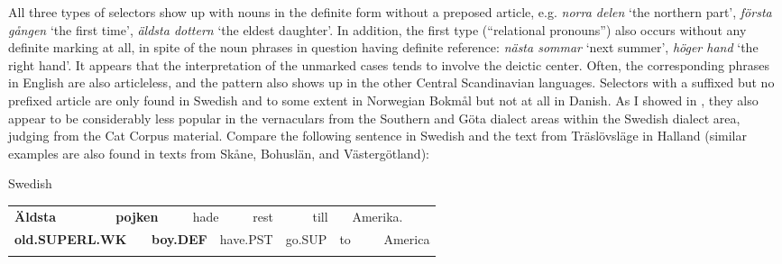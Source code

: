 \begin{styleBodytextC}
All three types of selectors show up with nouns in the definite form without a preposed article, e.g. \textit{norra delen} ‘the northern part’, \textit{första gången} ‘the first time’, \textit{äldsta dottern} ‘the eldest daughter’. In addition, the first type (“relational pronouns”) also occurs without any definite marking at all, in spite of the noun phrases in question having definite reference: \textit{nästa sommar} ‘next summer’, \textit{höger hand} ‘the right hand’. It appears that the interpretation of the unmarked cases tends to involve the deictic center. Often, the corresponding phrases in English are also articleless, and the pattern also shows up in the other Central Scandinavian languages. Selectors with a suffixed but no prefixed article are only found in Swedish and to some extent in Norwegian Bokmål but not at all in Danish. As I showed in \citet{Dahl2003}, they also appear to be considerably less popular in the vernaculars from the Southern and Göta dialect areas within the Swedish dialect area, judging from the Cat Corpus material. Compare the following sentence in Swedish and the text from Träslövsläge in Halland (similar examples are also found in texts from Skåne, Bohuslän, and Västergötland):

\end{styleBodytextC}


\begin{listWWNumileveli}
\item 

\end{listWWNumileveli}

\begin{listWWNumlxiileveli}
\item 

\begin{styleExLtrTbl}
Swedish

\end{styleExLtrTbl}

\end{listWWNumlxiileveli}

\begin{tabular}{llllllllllll}
\lsptoprule
{\bfseries Äldsta} & \multicolumn{2}{l}{{\bfseries pojken}

} & \multicolumn{2}{l}{hade

} & \multicolumn{2}{l}{rest

} & \multicolumn{2}{l}{till

} & \multicolumn{2}{l}{Amerika.

} & \\
\multicolumn{2}{l}{{\bfseries old.SUPERL.WK}

} & \multicolumn{2}{l}{{\bfseries boy.DEF}

} & \multicolumn{2}{l}{have.PST

} & \multicolumn{2}{l}{go.SUP

} & \multicolumn{2}{l}{to

} & \multicolumn{2}{l}{America

}\\
\lspbottomrule
\end{tabular}

